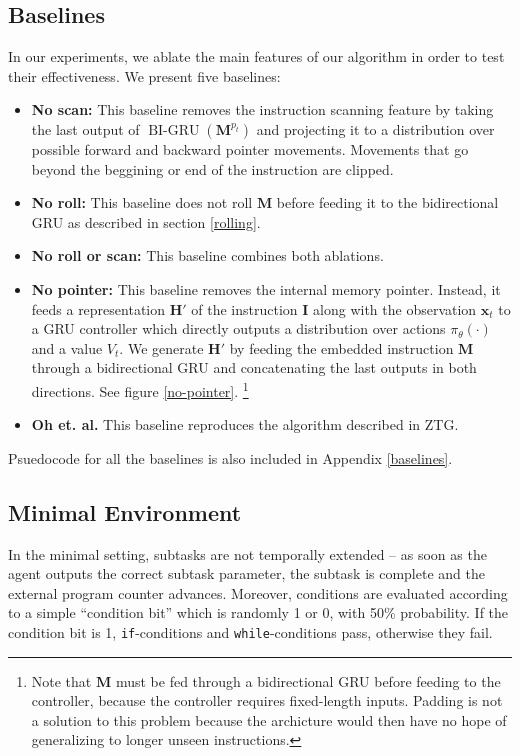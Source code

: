 \documentclass{article}
\DeclareMathOperator{\BIGRU}{BI-GRU}
\begin{document}
\subsection{Baselines}
In our experiments, we ablate the main features of our algorithm in order to
test their effectiveness. We present five baselines:
\begin{itemize}
  \item \textbf{No scan:} This baseline removes the instruction scanning feature by
    taking the last output of $\BIGRU(\mathbf{M}^{p_t})$ and projecting it to
    a distribution over possible forward and backward pointer movements.
    Movements that go beyond the beggining or end of the instruction are clipped.
  \item \textbf{No roll:} This baseline does not roll $\mathbf{M}$ before feeding
    it to the bidirectional GRU as described in section \ref{rolling}.
  \item \textbf{No roll or scan:} This baseline combines both ablations.
  \item \textbf{No pointer:} This baseline removes the internal memory pointer.
    Instead, it feeds a representation $\mathbf{H}'$ of the instruction
    $\mathbf{I}$ along with the observation $\mathbf{x}_t$ to a GRU controller
    which directly outputs a distribution over actions $\pi_\theta(\cdot)$ and a
    value $V_t$. We generate $\mathbf{H}'$ by feeding the embedded instruction
    $\mathbf{M}$ through a bidirectional GRU and concatenating the last outputs
    in both directions. See figure \ref{no-pointer}. \footnote{Note that $\mathbf{M}$
    must be fed through a bidirectional GRU before feeding to the controller,
  because the controller requires fixed-length inputs. Padding is not a solution
to this problem because the archicture would then have no hope of generalizing
to longer unseen instructions.}
  \item \textbf{Oh et. al.} This baseline reproduces the algorithm described in
    ZTG.
\end{itemize}
Psuedocode for all the baselines is also included in Appendix \ref{baselines}.

\subsection{Minimal Environment}
In the minimal setting, subtasks are not
temporally extended -- as soon as the agent outputs the correct subtask
parameter, the subtask is complete and the external program counter advances.
Moreover, conditions are evaluated according to a simple ``condition bit'' which
is randomly 1 or 0, with 50\% probability. If the condition bit is 1,
\texttt{if}-conditions and \texttt{while}-conditions pass, otherwise they fail.
\end{document}
